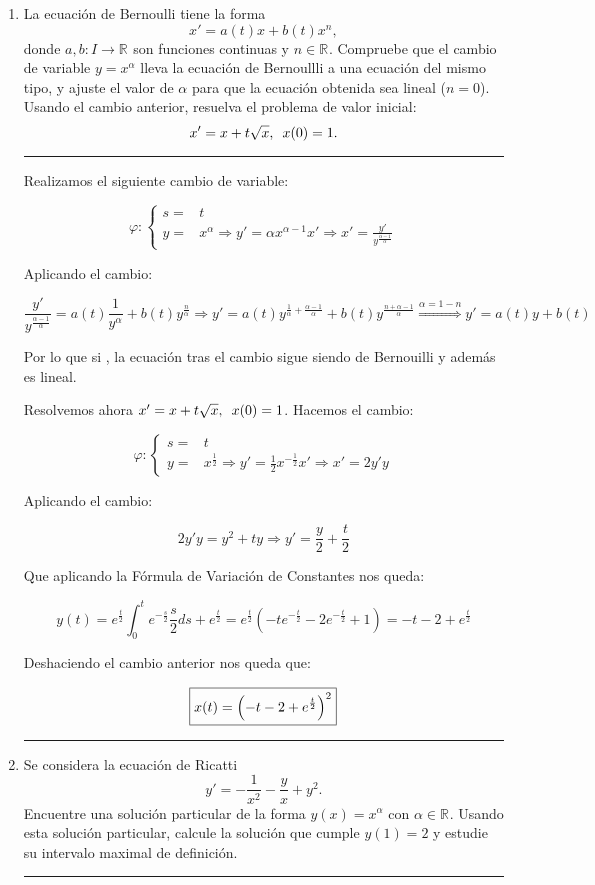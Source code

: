 \documentclass[12pt]{article}
\newcommand{\R}[1][]{\mathbb{R}^{#1}}
\newcommand{\solution}[1]{\text{\fbox{$#1$}}}
\begin{document}
\begin{enumerate}
\hrule
\item La ecuación de Bernoulli tiene la forma
\[
x'=a(t)x+b(t)x^n,
\]
donde $a,b: I \longrightarrow \R$ son funciones continuas y $n\in\R$. Compruebe que el cambio de variable $y=x^\alpha$ lleva la ecuación de Bernoullli a una ecuación del mismo tipo, y ajuste el valor de $\alpha$ para que la ecuación obtenida sea lineal ($n=0$). Usando el cambio anterior, resuelva el problema de valor inicial:
\[
x'=x+t\sqrt{x}, \enskip x(0)=1.
\]
\hrule

Realizamos el siguiente cambio de variable:

\[
\varphi : \left \{ \begin{array}{ll}
s=&t \\
y=&x^\alpha \Longrightarrow y'=\alpha x^{\alpha - 1}x' \Longrightarrow x'=\displaystyle\frac{y'}{y^{\frac{\alpha-1}{\alpha}}}
\end{array}
\right.
\]

Aplicando el cambio:

\[
\frac{y'}{y^{\frac{\alpha-1}{\alpha}}}=a(t)\frac{1}{y^\alpha}+b(t)y^{\frac{n}{\alpha}}\Longrightarrow y'=a(t)y^{\frac{1}{\alpha}+\frac{\alpha-1}{\alpha}}+b(t)y^{\frac{n+\alpha-1}{\alpha}} \stackrel{\alpha=1-n}{\Longrightarrow} y'=a(t)y+b(t)
\]

Por lo que si \solution{\alpha=1-n}, la ecuación tras el cambio sigue siendo de Bernouilli y además es lineal.

Resolvemos ahora $x'=x+t\sqrt{x}, \enskip x(0)=1$. Hacemos el cambio:

\[
\varphi : \left \{ \begin{array}{ll}
s=&t \\
y=&x^{\frac{1}{2}} \Longrightarrow y'=\frac{1}{2}x^{-\frac{1}{2}}x' \Longrightarrow x' = 2y'y
\end{array}
\right.
\]

Aplicando el cambio:

\[
2y'y=y^2+ty \Longrightarrow y'=\frac{y}{2}+\frac{t}{2}
\]

Que aplicando la Fórmula de Variación de Constantes nos queda:

\[
\displaystyle y(t)=e^{\frac{t}{2}}\int_{0}^{t}e^{-\frac{s}{2}}\frac{s}{2}ds+e^{\frac{t}{2}}=e^{\frac{t}{2}}\left( -te^{-\frac{t}{2}} -2e^{-\frac{t}{2}}+1 \right)=-t-2+e^{\frac{t}{2}}
\]

Deshaciendo el cambio anterior nos queda que:

\[
\solution{x(t)=\left( -t-2+e^{\frac{t}{2}} \right)^2}
\]

\hrule
\item Se considera la ecuación de Ricatti 
\[
y'=-\frac{1}{x^2}-\frac{y}{x}+y^2.
\]
Encuentre una solución particular de la forma $y(x)=x^\alpha$ con $\alpha \in \R$. Usando esta solución particular, calcule la solución que cumple $y(1)=2$ y estudie su intervalo maximal de definición.
\hrule


\end{enumerate}
\end{document}
